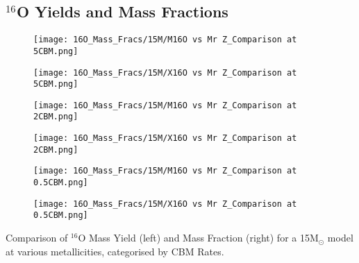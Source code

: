 \subsection{$^{16}$O Yields and Mass Fractions}
\begin{minipage}{\textwidth}
	\centering
	\begin{subfigure}{0.49\textwidth}
		\texttt{[image: 16O\_Mass\_Fracs/15M/M16O vs Mr Z\_Comparison at 5CBM.png]}
	\end{subfigure}
        \hfill
	\begin{subfigure}{0.49\textwidth}
		\texttt{[image: 16O\_Mass\_Fracs/15M/X16O vs Mr Z\_Comparison at 5CBM.png]}
	\end{subfigure}
        \label{fig:16O_15M_5CBM}
\end{minipage}
\begin{minipage}{\textwidth}
	\centering
	\begin{subfigure}{0.49\textwidth}
		\texttt{[image: 16O\_Mass\_Fracs/15M/M16O vs Mr Z\_Comparison at 2CBM.png]}
	\end{subfigure}
        \hfill
	\begin{subfigure}{0.49\textwidth}
		\texttt{[image: 16O\_Mass\_Fracs/15M/X16O vs Mr Z\_Comparison at 2CBM.png]}
	\end{subfigure}
        \label{fig:16O_15M_5CBM}
\end{minipage}
\begin{minipage}{\textwidth}
	\centering
	\begin{subfigure}{0.49\textwidth}
		\texttt{[image: 16O\_Mass\_Fracs/15M/M16O vs Mr Z\_Comparison at 0.5CBM.png]}
	\end{subfigure}
        \hfill
	\begin{subfigure}{0.49\textwidth}
		\texttt{[image: 16O\_Mass\_Fracs/15M/X16O vs Mr Z\_Comparison at 0.5CBM.png]}
	\end{subfigure}
	 \caption{Comparison of $^{16}$O Mass Yield (left) and Mass Fraction (right) for a 15M$_\odot$ model at various metallicities, categorised by CBM Rates.}
        \label{fig:16O_15M_0.5CBM}
\end{minipage}

